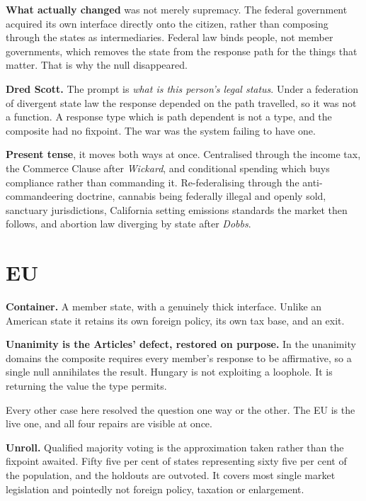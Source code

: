 \documentclass[11pt,a4paper]{article}
\begin{document}
\textbf{What actually changed} was not merely supremacy. The federal government
acquired its own interface directly onto the citizen, rather than composing through
the states as intermediaries. Federal law binds people, not member governments,
which removes the state from the response path for the things that matter. That is
why the null disappeared.

\textbf{Dred Scott.} The prompt is \emph{what is this person's legal status}. Under
a federation of divergent state law the response depended on the path travelled, so
it was not a function. A response type which is path dependent is not a type, and
the composite had no fixpoint. The war was the system failing to have one.

\textbf{Present tense}, it moves both ways at once. Centralised through the income
tax, the Commerce Clause after \emph{Wickard}, and conditional spending which buys
compliance rather than commanding it. Re-federalising through the anti-commandeering
doctrine, cannabis being federally illegal and openly sold, sanctuary jurisdictions,
California setting emissions standards the market then follows, and abortion law
diverging by state after \emph{Dobbs}.

\section{EU}

\begin{sectionbox}
\textbf{Container.} A member state, with a genuinely thick interface. Unlike an
American state it retains its own foreign policy, its own tax base, and an exit.

\textbf{Unanimity is the Articles' defect, restored on purpose.} In the unanimity
domains the composite requires every member's response to be affirmative, so a
single null annihilates the result. Hungary is not exploiting a loophole. It is
returning the value the type permits.
\end{sectionbox}

Every other case here resolved the question one way or the other. The EU is the
live one, and all four repairs are visible at once.

\textbf{Unroll.} Qualified majority voting is the approximation taken rather than
the fixpoint awaited. Fifty five per cent of states representing sixty five per cent
of the population, and the holdouts are outvoted. It covers most single market
legislation and pointedly not foreign policy, taxation or enlargement.
\end{document}
